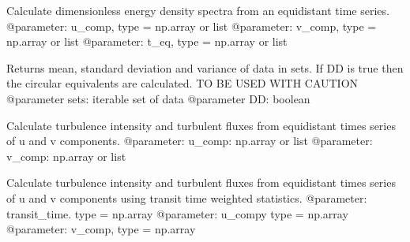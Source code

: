 \documentclass[letterpaper,10pt,english]{sphinxmanual}
\begin{document}

\begin{fulllineitems}
\label{\detokenize{index:windtunnel.calc_spectra}}
Calculate dimensionless energy density spectra from an equidistant 
time series.
@parameter: u\_comp, type = np.array or list
@parameter: v\_comp, type = np.array or list
@parameter: t\_eq, type = np.array or list

\end{fulllineitems}


\begin{fulllineitems}
\label{\detokenize{index:windtunnel.calc_stats}}
Returns mean, standard deviation and variance of data in sets. If DD is 
true then the circular equivalents are calculated. TO BE USED WITH CAUTION
@parameter sets: iterable set of data
@parameter DD: boolean

\end{fulllineitems}


\begin{fulllineitems}
\label{\detokenize{index:windtunnel.calc_turb_data}}
Calculate turbulence intensity and turbulent fluxes from equidistant
times series of u and v components.
@parameter: u\_comp: np.array or list
@parameter: v\_comp: np.array or list

\end{fulllineitems}


\begin{fulllineitems}
\label{\detokenize{index:windtunnel.calc_turb_data_wght}}
Calculate turbulence intensity and turbulent fluxes from equidistant
times series of u and v components using transit time weighted statistics.
@parameter: transit\_time. type = np.array
@parameter: u\_compy type = np.array
@parameter: v\_comp, type = np.array

\end{fulllineitems}
\end{document}
